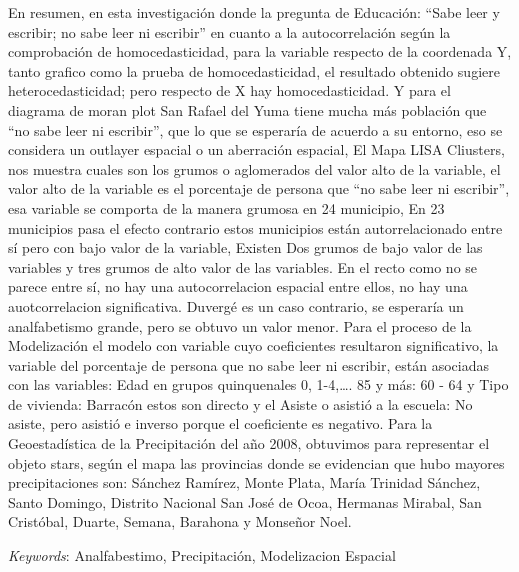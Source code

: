 \documentclass[11pt,]{article}
\renewenvironment{abstract}
 {{%
    \setlength{\leftmargin}{0mm}
    \setlength{\rightmargin}{\leftmargin}%
  }%
  \relax}
 {\endlist}
\begin{document}
\begin{abstract}

    \hbox{\vrule height .2pt width 39.14pc}

    \vskip 8.5pt %

\noindent En resumen, en esta investigación donde la pregunta de Educación: ``Sabe
leer y escribir; no sabe leer ni escribir'' en cuanto a la
autocorrelación según la comprobación de homocedasticidad, para la
variable respecto de la coordenada Y, tanto grafico como la prueba de
homocedasticidad, el resultado obtenido sugiere heterocedasticidad; pero
respecto de X hay homocedasticidad. Y para el diagrama de moran plot San
Rafael del Yuma tiene mucha más población que ``no sabe leer ni
escribir'', que lo que se esperaría de acuerdo a su entorno, eso se
considera un outlayer espacial o un aberración espacial, El Mapa LISA
Cliusters, nos muestra cuales son los grumos o aglomerados del valor
alto de la variable, el valor alto de la variable es el porcentaje de
persona que ``no sabe leer ni escribir'', esa variable se comporta de la
manera grumosa en 24 municipio, En 23 municipios pasa el efecto
contrario estos municipios están autorrelacionado entre sí pero con bajo
valor de la variable, Existen Dos grumos de bajo valor de las variables
y tres grumos de alto valor de las variables. En el recto como no se
parece entre sí, no hay una autocorrelacion espacial entre ellos, no hay
una auotcorrelacion significativa. Duvergé es un caso contrario, se
esperaría un analfabetismo grande, pero se obtuvo un valor menor. Para
el proceso de la Modelización el modelo con variable cuyo coeficientes
resultaron significativo, la variable del porcentaje de persona que no
sabe leer ni escribir, están asociadas con las variables: Edad en grupos
quinquenales 0, 1-4,\ldots{}. 85 y más: 60 - 64 y Tipo de vivienda:
Barracón estos son directo y el Asiste o asistió a la escuela: No
asiste, pero asistió e inverso porque el coeficiente es negativo. Para
la Geoestadística de la Precipitación del año 2008, obtuvimos para
representar el objeto stars, según el mapa las provincias donde se
evidencian que hubo mayores precipitaciones son: Sánchez Ramírez, Monte
Plata, María Trinidad Sánchez, Santo Domingo, Distrito Nacional San José
de Ocoa, Hermanas Mirabal, San Cristóbal, Duarte, Semana, Barahona y
Monseñor Noel.


\vskip 8.5pt \noindent \emph{Keywords}: Analfabestimo, Precipitación, Modelizacion Espacial \par

    \hbox{\vrule height .2pt width 39.14pc}



\end{abstract}
\end{document}
